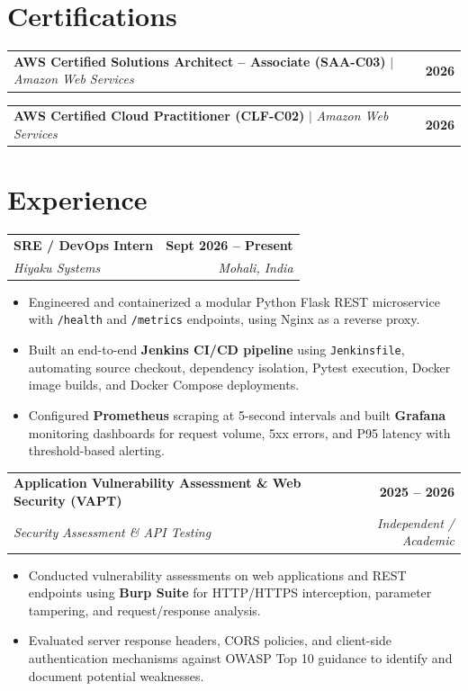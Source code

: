 \documentclass[letterpaper,9.8pt]{article}
\makeatletter
\newcommand{\resumeItemListStart}{\begin{itemize}[leftmargin=0.18in, labelsep=0.06in, itemsep=0.8pt, topsep=0.5pt, parsep=0pt, partopsep=0pt]}
\newcommand{\resumeItemListEnd}{\end{itemize}\vspace{2pt}}
\newcommand{\resumeExpHeader}[4]{
  \vspace{1pt}
  \begin{tabular*}{1.0\textwidth}[t]{l@{\extracolsep{\fill}}r}
    \textbf{#1} & \textbf{\small #2} \\
    \textit{\small #3} & \textit{\small #4} \\
  \end{tabular*}\vspace{-3.5pt}
}
\newcommand{\resumeCertHeader}[3]{
  \vspace{0.5pt}
  \begin{tabular*}{1.0\textwidth}[t]{l@{\extracolsep{\fill}}r}
    \textbf{#1} $\vert$ \textit{\small #2} & \textbf{\small #3} \\
  \end{tabular*}\vspace{-3.5pt}
}
\makeatother
\begin{document}
\section{Certifications}
\resumeCertHeader{AWS Certified Solutions Architect -- Associate (SAA-C03)}{Amazon Web Services}{2026}
\resumeCertHeader{AWS Certified Cloud Practitioner (CLF-C02)}{Amazon Web Services}{2026}
\vspace{2pt}

\section{Experience}
\resumeExpHeader{SRE / DevOps Intern}{Sept 2026 -- Present}{Hiyaku Systems}{Mohali, India}
\resumeItemListStart
  \item \small{Engineered and containerized a modular Python Flask REST microservice with \texttt{/health} and \texttt{/metrics} endpoints, using Nginx as a reverse proxy.}
  \item \small{Built an end-to-end \textbf{Jenkins CI/CD pipeline} using \texttt{Jenkinsfile}, automating source checkout, dependency isolation, Pytest execution, Docker image builds, and Docker Compose deployments.}
  \item \small{Configured \textbf{Prometheus} scraping at 5-second intervals and built \textbf{Grafana} monitoring dashboards for request volume, 5xx errors, and P95 latency with threshold-based alerting.}
\resumeItemListEnd

\resumeExpHeader{Application Vulnerability Assessment \& Web Security (VAPT)}{2025 -- 2026}{Security Assessment \& API Testing}{Independent / Academic}
\resumeItemListStart
  \item \small{Conducted vulnerability assessments on web applications and REST endpoints using \textbf{Burp Suite} for HTTP/HTTPS interception, parameter tampering, and request/response analysis.}
  \item \small{Evaluated server response headers, CORS policies, and client-side authentication mechanisms against OWASP Top 10 guidance to identify and document potential weaknesses.}
\resumeItemListEnd

\end{document}
